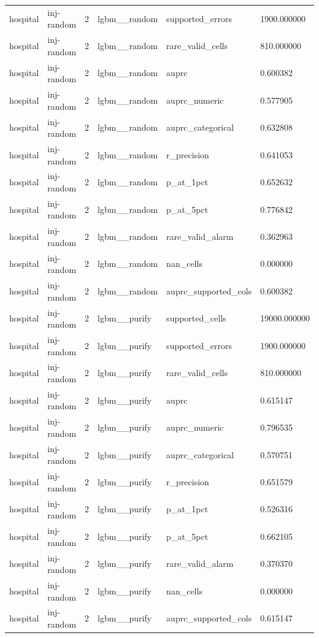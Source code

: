 \begin{tabular}{llllll}
hospital & inj-random & 2 & lgbm\_\_random & supported\_errors & 1900.000000 \\
hospital & inj-random & 2 & lgbm\_\_random & rare\_valid\_cells & 810.000000 \\
hospital & inj-random & 2 & lgbm\_\_random & auprc & 0.600382 \\
hospital & inj-random & 2 & lgbm\_\_random & auprc\_numeric & 0.577905 \\
hospital & inj-random & 2 & lgbm\_\_random & auprc\_categorical & 0.632808 \\
hospital & inj-random & 2 & lgbm\_\_random & r\_precision & 0.641053 \\
hospital & inj-random & 2 & lgbm\_\_random & p\_at\_1pct & 0.652632 \\
hospital & inj-random & 2 & lgbm\_\_random & p\_at\_5pct & 0.776842 \\
hospital & inj-random & 2 & lgbm\_\_random & rare\_valid\_alarm & 0.362963 \\
hospital & inj-random & 2 & lgbm\_\_random & nan\_cells & 0.000000 \\
hospital & inj-random & 2 & lgbm\_\_random & auprc\_supported\_cols & 0.600382 \\
hospital & inj-random & 2 & lgbm\_\_purify & supported\_cells & 19000.000000 \\
hospital & inj-random & 2 & lgbm\_\_purify & supported\_errors & 1900.000000 \\
hospital & inj-random & 2 & lgbm\_\_purify & rare\_valid\_cells & 810.000000 \\
hospital & inj-random & 2 & lgbm\_\_purify & auprc & 0.615147 \\
hospital & inj-random & 2 & lgbm\_\_purify & auprc\_numeric & 0.796535 \\
hospital & inj-random & 2 & lgbm\_\_purify & auprc\_categorical & 0.570751 \\
hospital & inj-random & 2 & lgbm\_\_purify & r\_precision & 0.651579 \\
hospital & inj-random & 2 & lgbm\_\_purify & p\_at\_1pct & 0.526316 \\
hospital & inj-random & 2 & lgbm\_\_purify & p\_at\_5pct & 0.662105 \\
hospital & inj-random & 2 & lgbm\_\_purify & rare\_valid\_alarm & 0.370370 \\
hospital & inj-random & 2 & lgbm\_\_purify & nan\_cells & 0.000000 \\
hospital & inj-random & 2 & lgbm\_\_purify & auprc\_supported\_cols & 0.615147 \\

\end{tabular}
